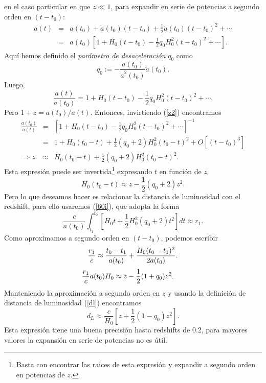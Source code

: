 en el caso particular en que $z\ll1$, para expandir en serie de potencias a segundo orden en $(t-t_{0})$:\\
\begin{eqnarray}
 a(t)&=&a(t_0)+\dot{a}(t_0)(t-t_0)+\frac{1}{2}\ddot{a}(t_0)(t-t_0)^2+\cdots \\
&=& a(t_0)\left[1+H_0(t-t_0)-\frac{1}{2}q_0H_0^2(t-t_0)^2+\cdots\right]. 
\end{eqnarray}
Aquí hemos definido el \textit{parámetro de desaceleración} $q_0$ como 
\begin{equation}
q_0:=-\frac{a(t_0)}{\dot{a}^2(t_0)}\ddot{a}(t_0).\label{q0}
\end{equation}
Luego,
\begin{equation}
\frac{a(t)}{a(t_0)}=1+H_0(t-t_0)-\frac{1}{2}q_0H_0^2(t-t_0)^2+\cdots .\label{z2}
\end{equation}
Pero $1+z=a(t_0)/a(t)$. Entonces, invirtiendo (\ref{z2}) encontramos
\begin{eqnarray}
 \frac{a(t_0)}{a(t)}&=&\left[1+H_0(t-t_0)-\frac{1}{2}q_0H_0^2(t-t_0)^2+\cdots\right]^{-1} \\
&=& 1+H_0(t_0-t)+\frac{1}{2}(q_0 +2)H_0^2(t_0-t)^2+ O\left[(t-t_{0})^3\right]\\
\Rightarrow z&\approx&H_0(t_0-t)+\frac{1}{2}(q_0 +2)H_0^2(t_0-t)^2.   \label{z3}
\end{eqnarray}
Esta expresión puede ser invertida\footnote{Basta con encontrar las raices de esta expresión y expandir a segundo orden en potencias de $z$.} expresando $t$ en función de $z$
\begin{equation}
 H_{0}(t_0 -t)\approx  z -\frac{1}{2}(q_0 +2)z^2.
\end{equation}
Pero lo que deseamos hacer es relacionar la distancia de luminosidad con el redshift, para ello usaremos (\ref{60i}), que adopta la forma
\begin{equation}
\frac{c}{a(t_0)}\int_{t_1}^{t_0}\left[H_{0}t+\frac{1}{2}H_{0}^{2}(q_0 +2)t^2\right]dt \approx r_1.
\end{equation}
Como aproximamos a segundo orden en $(t-t_{0})$, podemos escribir
\begin{equation}
  \frac{r_1}{c} \approx \frac{t_0 -t_1}{a(t_0)} +\frac{H_{0}(t_0 -t_1)^2}{2a(t_0)}.\\
\end{equation}
\begin{equation}
   \frac{r_1}{c} a(t_0) H_0 \approx z -\frac{1}{2}(1+ q_0)z^2. \hspace{0.5cm}
\end{equation}
Manteniendo la aproximación a segundo orden en $z$ y usando la definición de distancia de luminosidad (\ref{dl}) encontramos
\begin{equation}
d_{L}\approx \frac{c}{H_0}\left[z+\frac{1}{2}(1-q_0)z^2 \right]. \label{dlq0}
\end{equation}
Esta expresión tiene una buena precisión hasta redshifts de 0.2, para mayores valores la expansión en serie de potencias no es útil.

